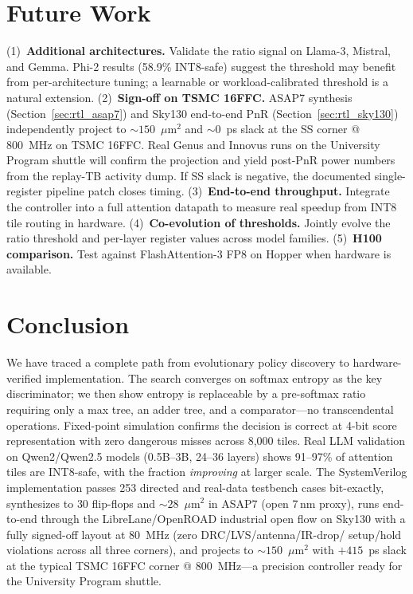 \documentclass[10pt,twocolumn]{article}
\begin{document}
\section{Future Work}

(1)~\textbf{Additional architectures.}
Validate the ratio signal on Llama-3, Mistral, and Gemma. Phi-2
results (58.9\% INT8-safe) suggest the threshold may benefit from
per-architecture tuning; a learnable or workload-calibrated threshold
is a natural extension.
(2)~\textbf{Sign-off on TSMC 16FFC.}
ASAP7 synthesis (Section~\ref{sec:rtl_asap7}) and Sky130
end-to-end PnR (Section~\ref{sec:rtl_sky130}) independently project
to $\sim\!150$~$\mu$m$^2$ and $\sim\!0$~ps slack at the SS corner
@ 800~MHz on TSMC 16FFC. Real Genus and Innovus runs on the
University Program shuttle will confirm the projection and yield
post-PnR power numbers from the replay-TB activity dump. If SS slack
is negative, the documented single-register pipeline patch closes
timing.
(3)~\textbf{End-to-end throughput.}
Integrate the controller into a full attention datapath to measure
real speedup from INT8 tile routing in hardware.
(4)~\textbf{Co-evolution of thresholds.}
Jointly evolve the ratio threshold and per-layer register values
across model families.
(5)~\textbf{H100 comparison.}
Test against FlashAttention-3 FP8 on Hopper when hardware is available.

\section{Conclusion}

We have traced a complete path from evolutionary policy discovery to
hardware-verified implementation. The search converges on softmax
entropy as the key discriminator; we then show entropy is replaceable
by a pre-softmax ratio requiring only a max tree, an adder tree, and
a comparator---no transcendental operations. Fixed-point simulation
confirms the decision is correct at 4-bit score representation with
zero dangerous misses across 8{,}000 tiles. Real LLM validation on
Qwen2/Qwen2.5 models (0.5B--3B, 24--36 layers) shows 91--97\% of
attention tiles are INT8-safe, with the fraction \emph{improving} at
larger scale. The SystemVerilog implementation passes 253 directed and
real-data testbench cases bit-exactly, synthesizes to $30$ flip-flops
and $\sim\!28$~$\mu$m$^2$ in ASAP7 (open 7\,nm proxy), runs end-to-end
through the LibreLane/OpenROAD industrial open flow on Sky130 with a
fully signed-off layout at $80$~MHz (zero DRC/LVS/antenna/IR-drop/
setup/hold violations across all three corners), and projects to
$\sim\!150$~$\mu$m$^2$ with $+415$~ps slack at the typical TSMC 16FFC
corner @ 800~MHz---a precision controller ready for the University
Program shuttle.



\end{document}
